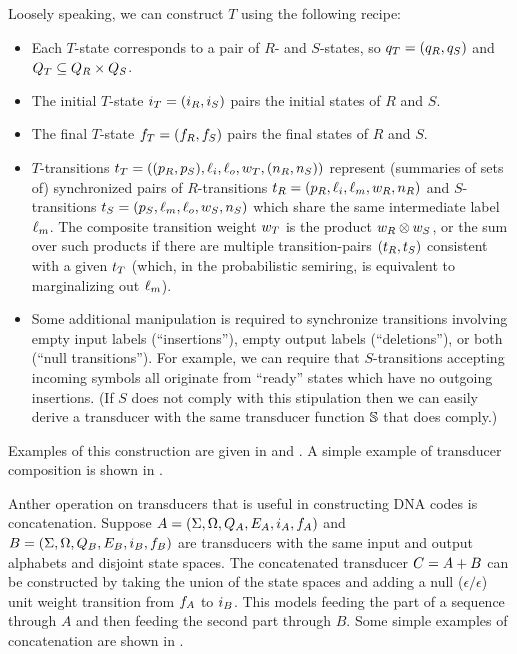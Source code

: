 \documentclass[english]{article}
\begin{document}
Loosely speaking, we can construct $T$ using the following recipe:
\begin{itemize}
\item Each $T$-state corresponds to a pair of $R$- and $S$-states,
so $q_T = (q_R, q_S)$
and $Q_T \subseteq Q_R \times Q_S$.
\item The initial $T$-state $i_T=(i_R,i_S)$ pairs the initial states of $R$ and $S$.
\item The final $T$-state $f_T=(f_R,f_S)$ pairs the final states of $R$ and $S$.
\item $T$-transitions
$t_T = ((p_R,p_S),\ell_i,\ell_o,w_T,(n_R,n_S))$
represent (summaries of sets of) synchronized pairs of $R$-transitions
$t_R = (p_R,\ell_i,\ell_m,w_R,n_R)$
and $S$-transitions
$t_S = (p_S,\ell_m,\ell_o,w_S,n_S)$
which share the same intermediate label $\ell_m$.
The composite transition weight $w_T$ is the product $w_R \otimes w_S$,
or the sum over such products if there are multiple transition-pairs $(t_R,t_S)$
consistent with a given $t_T$
(which, in the probabilistic semiring, is equivalent to marginalizing out $\ell_m$).
\item Some additional manipulation is required to synchronize
transitions involving empty input labels (``insertions''),
empty output labels (``deletions''),
or both (``null transitions'').
For example, we can require that $S$-transitions accepting incoming symbols
all originate from ``ready'' states which have no outgoing insertions.
(If $S$ does not comply with this stipulation then we can easily derive a transducer
with the same transducer function $\mathbb{S}$ that does comply.)
\end{itemize}

Examples of this construction are given in \cite{MohriPereiraRiley2000} and \cite{WestessonEtAlArxiv2012,WestessonEtAl2012}.
A simple example of transducer composition is shown in .

Anther operation on transducers that is useful in constructing DNA codes
is concatenation.
Suppose
 $A = (\Sigma, \Omega, Q_A, E_A, i_A, f_A)$ and
 $B = (\Sigma, \Omega, Q_B, E_B, i_B, f_B)$
are transducers with the same input and output alphabets and disjoint state spaces.
The concatenated transducer $C = A + B$ can be constructed by
taking the union of the state spaces and adding a null ($\epsilon/\epsilon$) unit weight transition
from $f_A$ to $i_B$.
This models feeding the part of a sequence through $A$ and then feeding the second part through $B$.
Some simple examples of concatenation are shown in .
\end{document}
